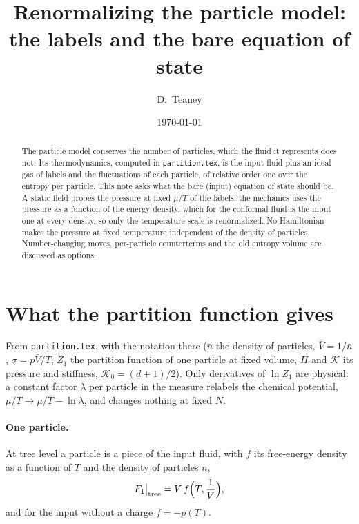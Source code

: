 \documentclass[11pt,aps,preprint,nofootinbib,superscriptaddress,tightenlines]{revtex4-2}
\def\st{\begin{equation}}
\def\stp{\end{equation}}
\let\oldparagraph\paragraph
\renewcommand{\paragraph}{\par\bigskip\oldparagraph}
\begin{document}
\title{Renormalizing the particle model: the labels and the bare equation of state}
\author{D.~Teaney}
\date{\today}

\begin{abstract}
The particle model conserves the number of particles, which the fluid it represents does not.  Its thermodynamics, computed in \texttt{partition.tex}, is the
input fluid plus an ideal gas of labels and the fluctuations of each particle, of relative order one over the entropy per particle.  This note asks what the
bare (input) equation of state should be.  A static field probes the pressure at fixed $\mu/T$ of the labels; the mechanics uses the pressure as a function of
the energy density, which for the conformal fluid is the input one at every density, so only the temperature scale is renormalized.  No Hamiltonian makes the
pressure at fixed temperature independent of the density of particles.  Number-changing moves, per-particle counterterms and the old entropy volume are
discussed as options.
\end{abstract}

\maketitle
\tableofcontents

\section{What the partition function gives}
\label{sec:recap}

From \texttt{partition.tex}, with the notation there ($\bar n$ the density of particles, $\bar V=1/\bar n$, $\sigma=p\bar V/T$, $Z_1$ the partition function of one
particle at fixed volume, $\Pi$ and $\mathcal K$ its pressure and stiffness, $\mathcal K_0=(d+1)/2$).  Only derivatives of $\ln Z_1$ are physical: a constant
factor $\lambda$ per particle in the measure relabels the chemical potential, $\mu/T\to\mu/T-\ln\lambda$, and changes nothing at fixed $N$.

\paragraph{One particle.}  At tree level a particle is a piece of the input fluid, with $f$ its free-energy density as a function of $T$ and the density of particles $n$,
\st
F_1\big|_{\rm tree}=V\,f\Big(T,\frac1V\Big),
\label{Ftree}
\stp
and for the input without a charge $f=-p(T)$.
\end{document}
